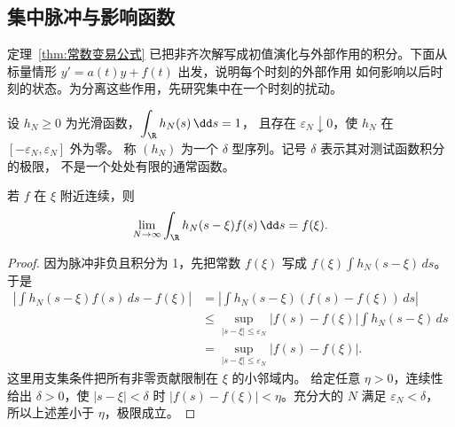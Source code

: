 \subsection*{集中脉冲与影响函数}
\label{sec:green-response}
定理~\ref{thm:常数变易公式} 已把非齐次解写成初值演化与外部作用的积分。下面从标量情形 $y'=a(t)y+f(t)$ 出发，说明每个时刻的外部作用
如何影响以后时刻的状态。为分离这些作用，先研究集中在一个时刻的扰动。

\begin{definition}
设 $h_N\geq0$ 为光滑函数，$\displaystyle\int_\R h_N(s)\,\dd s=1$，
且存在 $\varepsilon_N\downarrow0$，使 $h_N$ 在 $[-\varepsilon_N,\varepsilon_N]$ 外为零。
称 $(h_N)$ 为一个 $\delta$ 型序列。记号 $\delta$ 表示其对测试函数积分的极限，
不是一个处处有限的通常函数。
\end{definition}
\begin{lemma}
若 $f$ 在 $\xi$ 附近连续，则
\[
 \lim_{N\to\infty}\int_\R h_N(s-\xi)f(s)\,\dd s=f(\xi).
\]
\end{lemma}
\begin{proof}
因为脉冲非负且积分为 1，先把常数 $f(\xi)$ 写成
$f(\xi)\displaystyle\int h_N(s-\xi)\,ds$。于是
\begin{align*}
 \left|\int h_N(s-\xi)f(s)\,ds-f(\xi)\right|
 &=\left|\int h_N(s-\xi)(f(s)-f(\xi))\,ds\right|\\
 &\leq\sup_{|s-\xi|\leq\varepsilon_N}|f(s)-f(\xi)|
       \int h_N(s-\xi)\,ds\\
 &=\sup_{|s-\xi|\leq\varepsilon_N}|f(s)-f(\xi)|.
\end{align*}
这里用支集条件把所有非零贡献限制在 $\xi$ 的小邻域内。
给定任意 $\eta>0$，连续性给出 $\delta>0$，使 $|s-\xi|<\delta$ 时
$|f(s)-f(\xi)|<\eta$。充分大的 $N$ 满足 $\varepsilon_N<\delta$，
所以上述差小于 $\eta$，极限成立。
\end{proof}

